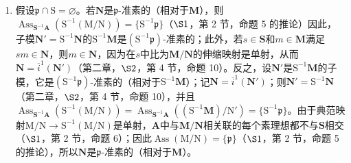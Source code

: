 \begin{enumerate}
\def\labelenumi{(\roman{enumi})}
\setcounter{enumi}{1}
\tightlist
\item
   假设\(\mathfrak{p} \cap \mathrm{S} = \varnothing\)。若\(\mathbf{N}\)是\(\mathfrak{p}\)-准素的（相对于\(\mathbf{M}\)），则\(\operatorname{Ass}_{\mathbf{S}^{-1}\mathbf{A}}(\mathrm{S}^{-1}(\mathrm{M/N})) = \{\mathrm{S}^{-1}\mathfrak{p}\}\)（\(\S 1\)，第 2 节，命题 5 的推论）因此，子模\(\mathbf{N}' = \mathrm{S}^{-1}\mathbf{N}\)的\(\mathrm{S}^{-1}\mathbf{M}\)是\((\mathrm{S}^{-1}\mathfrak{p})\)-准素的；此外，若\(s \in \mathbf{S}\)和\(m \in \mathbf{M}\)满足\(sm \in \mathbf{N}\)，则\(m \in \mathbf{N}\)，因为在\(s\)中比为\(\mathbf{M/N}\)的伸缩映射是单射，从而\(\mathbf{N} = \overline{i}^{1}(\mathbf{N}')\)（第二章，\(\S 2\)，第 4 节，命题 10）。反之，设\(\mathbf{N}'\)是\(\mathrm{S}^{-1}\mathbf{M}\)的子模，它是\((\mathrm{S}^{-1}\mathfrak{p})\)-准素的（相对于\(\mathrm{S}^{-1}\mathbf{M}\)）；记\(\mathbf{N} = \overline{i}^{1}(\mathbf{N}')\)；则\(\mathbf{N}' = \mathrm{S}^{-1}\mathbf{N}\)（第二章，\(\S 2\)，第 4 节，命题 10），并且\(\operatorname{Ass}_{\mathbf{S}^{-1}\mathbf{A}}(\mathrm{S}^{-1}(\mathrm{M/N})) = \operatorname{Ass}_{\mathbf{S}^{-1}\mathbf{A}}((\mathrm{S}^{-1}\mathbf{M})/\mathrm{N}') = \{\mathrm{S}^{-1}\mathfrak{p}\}\)。由于典范映射\(\mathrm{M/N} \to \mathrm{S}^{-1}(\mathrm{M/N})\)是单射，\(\mathbf{A}\)中与\(\mathbf{M/N}\)相关联的每个素理想都不与\(\mathbf{S}\)相交（\(\S 1\)，第 2 节，命题 6）；因此\(\operatorname{Ass}(\mathrm{M/N}) = \{\mathfrak{p}\}\)（\(\S 1\)，第 2 节，命题 5 的推论），所以\(\mathbf{N}\)是\(\mathfrak{p}\)-准素的（相对于\(\mathbf{M}\)）。
\end{enumerate}

